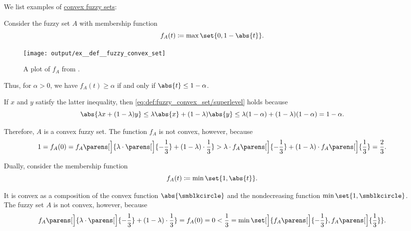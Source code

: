 \begin{example}\label{ex:def:fuzzy_convex_set}
  We list examples of \hyperref[def:fuzzy_convex_set]{convex fuzzy sets}:
  \begin{thmenum}
     Consider the fuzzy set \( A \) with membership function
    \begin{equation*}
      f_A(t) \coloneqq \max\set{ 0, 1 - \abs{t} }.
    \end{equation*}

    \begin{figure}[!ht]
      \centering
      \texttt{[image: output/ex\_\_def\_\_fuzzy\_convex\_set]}
      \caption{A plot of \( f_A \) from .}\label{fig:ex:def:fuzzy_convex_set/convex_set_not_convex_function}
    \end{figure}

    Thus, for \( \alpha > 0 \), we have \( f_A(t) \geq \alpha \) if and only if \( \abs{t} \leq 1 - \alpha \).

    If \( x \) and \( y \) satisfy the latter inequality, then \eqref{eq:def:fuzzy_convex_set/superlevel} holds because
    \begin{equation*}
      \abs{\lambda x + (1 - \lambda) y}
      \leq
      \lambda \abs{x} + (1 - \lambda) \abs{y}
      \leq
      \lambda (1 - \alpha) + (1 - \lambda) (1 - \alpha)
      =
      1 - \alpha.
    \end{equation*}

    Therefore, \( A \) is a convex fuzzy set. The function \( f_A \) is not convex, however, because
    \begin{equation*}
      1
      =
      f_A(0)
      =
      f_A\parens[\Big]{ \lambda \cdot \parens[\Big]{ - \frac 1 3 } + (1 - \lambda) \cdot \frac 1 3 }
      >
      \lambda \cdot f_A\parens[\Big]{ -\frac 1 3 } + (1 - \lambda) \cdot f_A\parens[\Big]{ \frac 1 3 }
      =
      \frac 2 3.
    \end{equation*}

     Dually, consider the membership function
    \begin{equation*}
      f_A(t) \coloneqq \min\set{ 1, \abs{t} }.
    \end{equation*}

    It is convex as a composition of the convex function \( \abs{ \anon } \) and the nondecreasing function \( \min\set{ 1, \anon } \). The fuzzy set \( A \) is not convex, however, because
    \begin{equation*}
      f_A\parens[\Big]{ \lambda \cdot \parens[\Big]{ - \frac 1 3 } + (1 - \lambda) \cdot \frac 1 3 }
      =
      f_A(0)
      =
      0
      <
      \frac 1 3
      =
      \min\set[\Big]{ f_A\parens[\Big]{ -\frac 1 3 }, f_A\parens[\Big]{ \frac 1 3 } }.
    \end{equation*}
  \end{thmenum}
\end{example}


